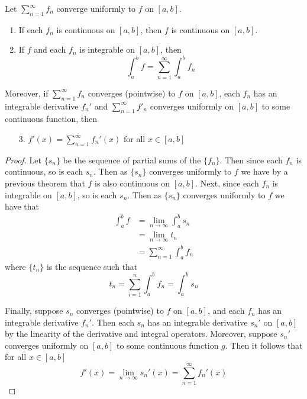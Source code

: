 \begin{cor}
    Let $\sum\limits_{n=1}^{\infty}f_n$ converge uniformly to $f$ on $[a,b]$. \begin{enumerate}
        \item If each $f_n$ is continuous on $[a,b]$, then $f$ is continuous on $[a,b]$.
        \item If $f$ and each $f_n$ is integrable on $[a,b]$, then \begin{equation*}
                \int_a^bf = \sum\limits_{n=1}^{\infty}\int_a^bf_n
        \end{equation*}
    \end{enumerate}
    Moreover, if $\sum\limits_{n=1}^{\infty}f_n$ converges (pointwise) to $f$ on $[a,b]$, each $f_n$ has an integrable derivative $f_n'$ and $\sum\limits_{n=1}^{\infty}f'_n$ converges uniformly on $[a,b]$ to some continuous function, then \begin{enumerate}
        \item[3.] $f'(x) = \sum\limits_{n=1}^{\infty}f_n'(x)$   for all $x \in [a,b]$
    \end{enumerate}
\end{cor}
\begin{proof}
    Let $\{s_n\}$ be the sequence of partial sums of the $\{f_n\}$. Then since each $f_n$ is continuous, so is each $s_n$. Then as $\{s_n\}$ converges uniformly to $f$ we have by a previous theorem that $f$ is also continuous on $[a,b]$. Next, since each $f_n$ is integrable on $[a,b]$, so is each $s_n$. Then as $\{s_n\}$ converges uniformly to $f$ we have that \begin{align*}
        \int_a^bf &= \lim\limits_{n\rightarrow \infty}\int_a^bs_n \\
        &= \lim\limits_{n\rightarrow\infty}t_n \\
        &= \sum\limits_{n=1}^{\infty}\int_a^bf_n
    \end{align*}
    where $\{t_n\}$ is the sequence such that \begin{equation*}
        t_n = \sum\limits_{i=1}^n\int_a^bf_n = \int_a^bs_n
    \end{equation*}

    Finally, suppose $s_n$ converges (pointwise) to $f$ on $[a,b]$, and each $f_n$ has an integrable derivative $f_n'$. Then each $s_n$ has an integrable derivative $s_n'$ on $[a,b]$ by the linearity of the derivative and integral operators. Moreover, suppose $s_n'$ converges uniformly on $[a,b]$ to some continuous function $g$. Then it follows that for all $x \in [a,b]$ \begin{equation*}
        f'(x) = \lim\limits_{n\rightarrow \infty}s_n'(x) = \sum\limits_{n=1}^{\infty}f_n'(x)
    \end{equation*}
\end{proof}


